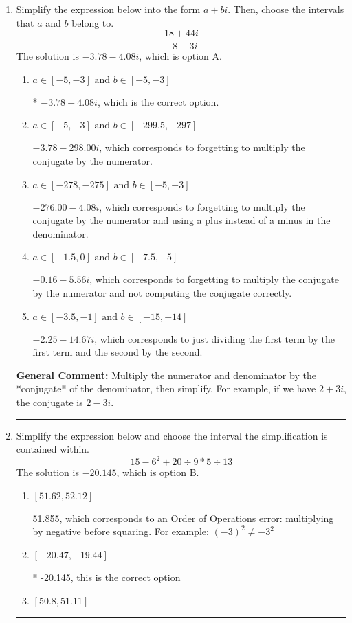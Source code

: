 \documentclass{extbook}[14pt]
\newcommand{\litem}[1]{\item #1

\rule{\textwidth}{0.4pt}}
\begin{document}
\begin{enumerate}\litem{
Simplify the expression below into the form $a+bi$. Then, choose the intervals that $a$ and $b$ belong to.
\[ \frac{18 + 44 i}{-8 - 3 i} \]The solution is \( -3.78  - 4.08 i \), which is option A.\begin{enumerate}[label=\Alph*.]
\item \( a \in [-5, -3] \text{ and } b \in [-5, -3] \)

* $-3.78  - 4.08 i$, which is the correct option.
\item \( a \in [-5, -3] \text{ and } b \in [-299.5, -297] \)

 $-3.78  - 298.00 i$, which corresponds to forgetting to multiply the conjugate by the numerator.
\item \( a \in [-278, -275] \text{ and } b \in [-5, -3] \)

 $-276.00  - 4.08 i$, which corresponds to forgetting to multiply the conjugate by the numerator and using a plus instead of a minus in the denominator.
\item \( a \in [-1.5, 0] \text{ and } b \in [-7.5, -5] \)

 $-0.16  - 5.56 i$, which corresponds to forgetting to multiply the conjugate by the numerator and not computing the conjugate correctly.
\item \( a \in [-3.5, -1] \text{ and } b \in [-15, -14] \)

 $-2.25  - 14.67 i$, which corresponds to just dividing the first term by the first term and the second by the second.
\end{enumerate}

\textbf{General Comment:} Multiply the numerator and denominator by the *conjugate* of the denominator, then simplify. For example, if we have $2+3i$, the conjugate is $2-3i$.
}
\litem{
Simplify the expression below and choose the interval the simplification is contained within.
\[ 15 - 6^2 + 20 \div 9 * 5 \div 13 \]The solution is \( -20.145 \), which is option B.\begin{enumerate}[label=\Alph*.]
\item \( [51.62, 52.12] \)

 51.855, which corresponds to an Order of Operations error: multiplying by negative before squaring. For example: $(-3)^2 \neq -3^2$
\item \( [-20.47, -19.44] \)

* -20.145, this is the correct option
\item \( [50.8, 51.11] \)


\end{enumerate}}
\end{enumerate}
\end{document}
